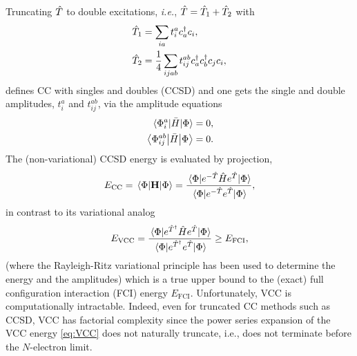 \documentclass[aip,jcp,reprint,noshowkeys,superscriptaddress]{revtex4-1}
\newcommand{\ie}{\textit{i.e.}}
\newcommand{\bH}{\mathbf{H}}
\newcommand{\hT}{\Hat{T}}
\newcommand{\hH}{\Hat{H}}
\begin{document}
Truncating $\hT$ to double excitations, \ie, $\hT = \hT_1 + \hT_2$ with 
\begin{subequations}
\begin{align}
	\hT_1 & = \sum_{ia} t_{i}^{a} c_a^{\dag} c_i,
        \\
	\hT_2 & = \frac{1}{4} \sum_{ijab} t_{ij}^{ab} c_a^{\dag} c_b^{\dag} c_j c_i,
\end{align}
\end{subequations}
defines CC with singles and doubles (CCSD) and one gets the single and double amplitudes, $t_{i}^{a}$ and $t_{ij}^{ab}$, via the amplitude equations
\begin{subequations}
\begin{align}
	\label{eq:T1_eq}
	\mel{\Phi_{i}^{a}}{\Bar{H}}{\Phi} & = 0,
	\\
	\label{eq:T2_eq}
	\mel{\Phi_{ij}^{ab}}{\Bar{H}}{\Phi} & = 0.
\end{align}
\end{subequations}
The (non-variational) CCSD energy is evaluated by projection,
\begin{equation}
	E_\text{CC} 
	= \mel{\Phi}{\bH}{\Phi} 
	= \frac{ \mel{\Phi}{ e^{-\hT} \hH e^{\hT} } {\Phi} }{ \mel{\Phi}{ e^{-\hT} e^{\hT} }{\Phi} },
\end{equation}
in contrast to its variational analog
\begin{equation}
	\label{eq:VCC}
	E_\text{VCC}  
	= \frac{\mel{\Phi}{e^{\hT^{\dag}} \hH e^{\hT}}{\Phi}}{\mel{\Phi}{e^{\hT^{\dag}} e^{\hT}}{\Phi}} 
	\ge E_\text{FCI},
\end{equation}
(where the Rayleigh-Ritz variational principle has been used to determine the energy and the amplitudes) which is a true upper bound to the (exact) full configuration interaction (FCI) energy $E_\text{FCI}$. 
Unfortunately, VCC is computationally intractable.
Indeed, even for truncated CC methods such as CCSD, VCC has factorial complexity since the power series expansion of the VCC energy \eqref{eq:VCC} does not naturally truncate, i.e., does not terminate before the $N$-electron limit.


\end{document}
